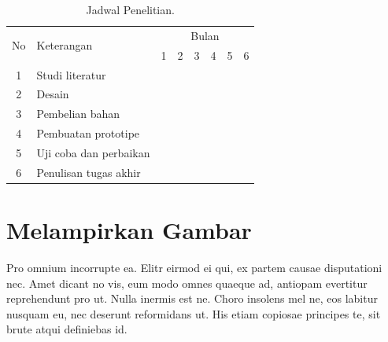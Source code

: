 		\begin{table}[H]
		\centering
		\caption{Jadwal Penelitian.} %
		\label{jadwal}
		\begin{tabular}{|c|l|l|l|l|l|l|l|}
		\hline
		\multirow{2}{*}{No} & \multirow{2}{*}{Keterangan} & \multicolumn{6}{c|}{Bulan}                                                                                                                          \\ \cline{3-8}
		                    &                             & 1 & 2 & 3 & 4 & 5 & 6 \\ \hline
		1                   & Studi literatur                                  &\cellcolor{gray} &\cellcolor{gray}&                        &                        &                        &                         \\ \hline
		2                   & Desain                                           &                        &\cellcolor{gray}&\cellcolor{gray}&                        &                        &                         \\ \hline
		3                   & Pembelian bahan                                  &                        &                        &\cellcolor{gray}&                        &                        &                         \\ \hline
		4                   & Pembuatan prototipe                              &                        &                        &\cellcolor{gray}&\cellcolor{gray}&\cellcolor{gray}&                         \\ \hline
		5                   & Uji coba dan perbaikan                           &                        &                        &                        &\cellcolor{gray}&\cellcolor{gray}&                         \\ \hline
		6                   & Penulisan tugas akhir                               &                        &                        &                        &                        &                        &\cellcolor{gray}\\ \hline
		\end{tabular}
		\end{table}


\section{Melampirkan Gambar}
\noindent Pro omnium incorrupte ea. Elitr eirmod ei qui, ex partem causae disputationi nec. Amet dicant no vis, eum modo omnes quaeque ad, antiopam evertitur reprehendunt pro ut. Nulla inermis est ne. Choro insolens mel ne, eos labitur nusquam eu, nec deserunt reformidans ut. His etiam copiosae principes te, sit brute atqui definiebas id.

